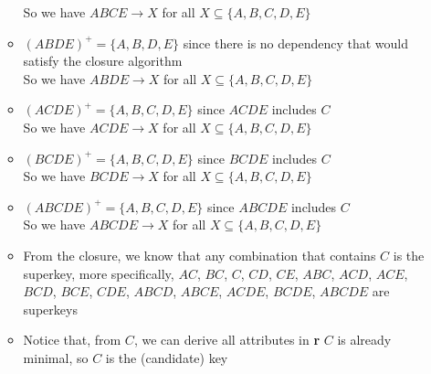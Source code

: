 \documentclass[12pt]{article}
\begin{document}
\begin{enumerate}
\begin{itemize}
                So we have $ABCE \longrightarrow X$ for all $X \subseteq \{A, B,
                C, D, E\}$
          \item $(ABDE)^+ = \{A, B, D, E\}$ since there is no dependency that
                would satisfy the closure algorithm \\
                So we have $ABDE \longrightarrow X$ for all $X \subseteq \{A, B,
                C, D, E\}$
          \item $(ACDE)^+ = \{A, B, C, D, E\}$ since $ACDE$ includes $C$ \\
                So we have $ACDE \longrightarrow X$ for all $X \subseteq \{A, B,
                C, D, E\}$
          \item $(BCDE)^+ = \{A, B, C, D, E\}$ since $BCDE$ includes $C$ \\
                So we have $BCDE \longrightarrow X$ for all $X \subseteq \{A, B,
                C, D, E\}$
          \item $(ABCDE)^+ = \{A, B, C, D, E\}$ since $ABCDE$ includes $C$ \\
                So we have $ABCDE \longrightarrow X$ for all $X \subseteq \{A,
                B, C, D, E\}$
          \item From the closure, we know that any combination that contains $C$
                is the superkey, more specifically, $AC$, $BC$, $C$, $CD$, $CE$,
                $ABC$, $ACD$, $ACE$, $BCD$, $BCE$, $CDE$, $ABCD$, $ABCE$,
                $ACDE$, $BCDE$, $ABCDE$ are superkeys
          \item Notice that, from $C$, we can derive all attributes in
                \textbf{r} $C$ is already minimal, so $C$ is the (candidate) key
        \end{itemize}
  \ \\


\end{enumerate}
\end{document}

